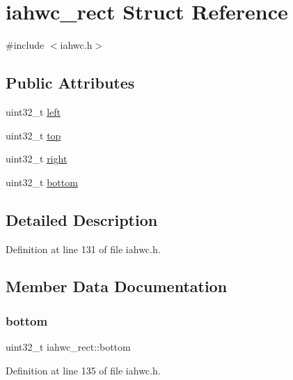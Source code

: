 \hypertarget{structiahwc__rect}{}\section{iahwc\+\_\+rect Struct Reference}
\label{structiahwc__rect}


{\ttfamily \#include $<$iahwc.\+h$>$}

\subsection*{Public Attributes}
\begin{DoxyCompactItemize}
\item 
uint32\+\_\+t \mbox{\hyperlink{structiahwc__rect_abdce07c1eb024c79de94fbc1d7a8d40b}{left}}
\item 
uint32\+\_\+t \mbox{\hyperlink{structiahwc__rect_a16e4547c603c2367753b32a76e547d91}{top}}
\item 
uint32\+\_\+t \mbox{\hyperlink{structiahwc__rect_a94734af35b59300dd43a54e42bb68ea4}{right}}
\item 
uint32\+\_\+t \mbox{\hyperlink{structiahwc__rect_ad23d12c83244012abee2eb585d8f2052}{bottom}}
\end{DoxyCompactItemize}


\subsection{Detailed Description}


Definition at line 131 of file iahwc.\+h.



\subsection{Member Data Documentation}
\mbox{\label{structiahwc__rect_ad23d12c83244012abee2eb585d8f2052}} 
\subsubsection{\texorpdfstring{bottom}{bottom}}
{\footnotesize\ttfamily uint32\+\_\+t iahwc\+\_\+rect\+::bottom}



Definition at line 135 of file iahwc.\+h.

\mbox{\label{structiahwc__rect_abdce07c1eb024c79de94fbc1d7a8d40b}} 
